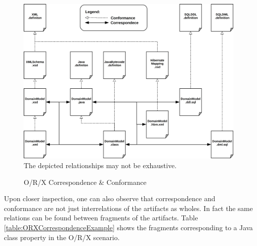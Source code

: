 \documentclass[runningheads,a4paper]{llncs}
\begin{document}
\begin{figure}[h!]
\centering
\includegraphics[width=\textwidth]{orx-correspondence-big-picture.png}
\\The depicted relationships may not be exhaustive.
\caption{O/R/X Correspondence \& Conformance}
\label{figure:ORXCorrespondenceBigPicture}
\end{figure}

Upon closer inspection, one can also observe that correspondence and conformance are not just interrelations of the artifacts as wholes.
In fact the same relations can be found between fragments of the artifacts.
Table \ref{table:ORXCorrespondenceExample} shows the fragments corresponding to a Java class property in the O/R/X scenario.

\begin{table}[h!]
\newline
\caption{O/R/X Fragment Correspondence}
\label{table:ORXCorrespondenceExample}
\end{table}
\end{document}
